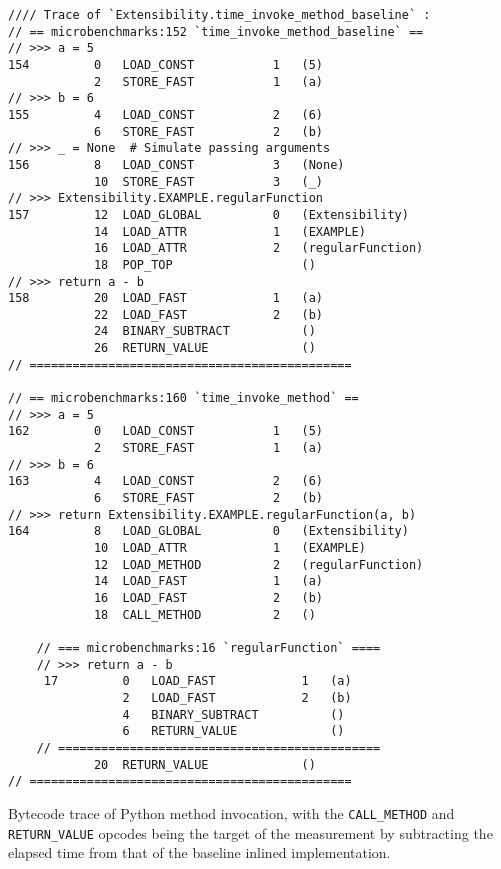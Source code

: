 \vspace{2em}
\begin{code}
    \begin{verbatim}
//// Trace of `Extensibility.time_invoke_method_baseline` :
// == microbenchmarks:152 `time_invoke_method_baseline` ==
// >>> a = 5
154         0   LOAD_CONST           1   (5)
            2   STORE_FAST           1   (a)
// >>> b = 6
155         4   LOAD_CONST           2   (6)
            6   STORE_FAST           2   (b)
// >>> _ = None  # Simulate passing arguments
156         8   LOAD_CONST           3   (None)
            10  STORE_FAST           3   (_)
// >>> Extensibility.EXAMPLE.regularFunction
157         12  LOAD_GLOBAL          0   (Extensibility)
            14  LOAD_ATTR            1   (EXAMPLE)
            16  LOAD_ATTR            2   (regularFunction)
            18  POP_TOP                  ()
// >>> return a - b
158         20  LOAD_FAST            1   (a)
            22  LOAD_FAST            2   (b)
            24  BINARY_SUBTRACT          ()
            26  RETURN_VALUE             ()
// =============================================

// == microbenchmarks:160 `time_invoke_method` ==
// >>> a = 5
162         0   LOAD_CONST           1   (5)
            2   STORE_FAST           1   (a)
// >>> b = 6
163         4   LOAD_CONST           2   (6)
            6   STORE_FAST           2   (b)
// >>> return Extensibility.EXAMPLE.regularFunction(a, b)
164         8   LOAD_GLOBAL          0   (Extensibility)
            10  LOAD_ATTR            1   (EXAMPLE)
            12  LOAD_METHOD          2   (regularFunction)
            14  LOAD_FAST            1   (a)
            16  LOAD_FAST            2   (b)
            18  CALL_METHOD          2   ()

    // === microbenchmarks:16 `regularFunction` ====
    // >>> return a - b
     17         0   LOAD_FAST            1   (a)
                2   LOAD_FAST            2   (b)
                4   BINARY_SUBTRACT          ()
                6   RETURN_VALUE             ()
    // =============================================
            20  RETURN_VALUE             ()
// =============================================
    \end{verbatim}
    \caption{Bytecode trace of Python method invocation, with the \texttt{CALL\_METHOD} and \texttt{RETURN\_VALUE} opcodes being the target of the measurement by subtracting the elapsed time from that of the baseline inlined implementation.}
    \label{listing:impact-dispatch-polymorphic-disassembly}
\end{code}
